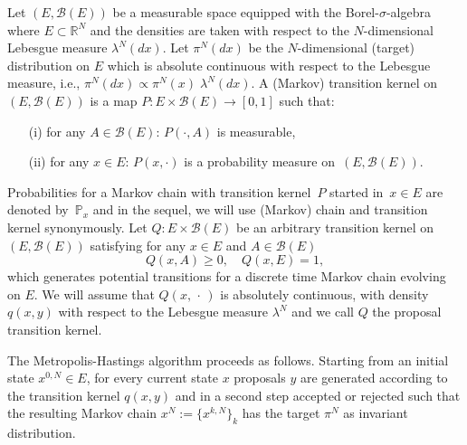 Let $ \left( E, \mathcal{B}(E) \right) $ be a measurable space equipped with the Borel-$\sigma$-algebra where $ E \subset \mathbb{R}^{N} $ and the densities are taken with respect to the $N$-dimensional Lebesgue measure $\lambda^{N}(dx)$. Let $ \pi^{N}(dx) $ be the $N$-dimensional (target) distribution on $ E $ which is absolute continuous with respect to the Lebesgue measure, i.e., $ \pi^{N}(dx) \varpropto \pi^{N}(x) \; \lambda^{N}(dx) $. A (Markov) transition kernel on~$\left( E, \mathcal{B}(E) \right) $ is a map $ P : E \times \mathcal{B}(E)  \to [0,1]$ such that:
\begin{enumerate}
 \item[(i)] for any $A \in \mathcal{B}(E)$: $P(\cdot, A) $ is measurable,
 \item[(ii)] for any $ x \in E $: $P(x, \cdot)$ is a probability measure on~$\left( E, \mathcal{B}(E) \right) $.
\end{enumerate}
Probabilities for a Markov chain with transition kernel~$P$ started in~$x \in E$ are denoted by~$ \mathbb{P}_x $ and in the sequel, we will use (Markov) chain and transition kernel synonymously. Let $ Q : E \times \mathcal{B}(E) $ be an arbitrary transition kernel on $\left( E, \mathcal{B}(E) \right) $ satisfying for any $ x \in E $ and $ A \in \mathcal{B}(E) $
\begin{equation}
\label{MH - proposal kernel}
 Q(x,A) \geq 0, \quad Q(x, E) = 1,
\end{equation}
which generates potential transitions for a discrete time Markov chain evolving on $ E $.  We will assume that $ Q(x, \, \cdot \,) $ is absolutely continuous, with density $ q(x,y) $  with respect to the Lebesgue measure $ \lambda^{N}$ and we call $Q$ the proposal transition kernel.

The Metropolis-Hastings algorithm proceeds as follows. Starting from an initial state $ x^{0,N} \in E $, for every current state $x$ proposals $y$ are generated according to the transition kernel $ q (x, y) $ and in a second step accepted or rejected such that the resulting Markov chain $ x^{N} := \{ x^{k,N} \}_{k} $ has the target $ \pi^{N} $ as invariant distribution.


